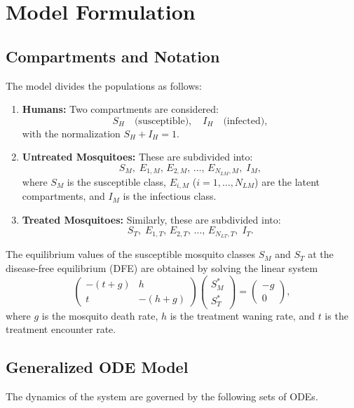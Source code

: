 \documentclass[12pt]{article}
\begin{document}
\section{Model Formulation}

\subsection{Compartments and Notation}
The model divides the populations as follows:
\begin{enumerate}
    \item \textbf{Humans:} Two compartments are considered:
    \[
    S_H \quad \text{(susceptible)}, \quad I_H \quad \text{(infected)},
    \]
    with the normalization \(S_H + I_H = 1\).
    
    \item \textbf{Untreated Mosquitoes:} These are subdivided into:
    \[
    S_M,\; E_{1,M},\, E_{2,M},\, \dots,\, E_{N_{LM},M},\; I_M,
    \]
    where \(S_M\) is the susceptible class, \(E_{i,M}\) (\(i=1,\dots,N_{LM}\)) are the latent compartments, and \(I_M\) is the infectious class.
    
    \item \textbf{Treated Mosquitoes:} Similarly, these are subdivided into:
    \[
    S_T,\; E_{1,T},\, E_{2,T},\, \dots,\, E_{N_{LT},T},\; I_T.
    \]
\end{enumerate}

The equilibrium values of the susceptible mosquito classes \(S_M\) and \(S_T\) at the disease-free equilibrium (DFE) are obtained by solving the linear system
\[
\begin{pmatrix}
-(t+g) & h \\
t       & -(h+g)
\end{pmatrix}
\begin{pmatrix}
S^*_M \\ S^*_T
\end{pmatrix}
=
\begin{pmatrix}
-g \\ 0
\end{pmatrix},
\]
where \(g\) is the mosquito death rate, \(h\) is the treatment waning rate, and \(t\) is the treatment encounter rate.

\subsection{Generalized ODE Model}
The dynamics of the system are governed by the following sets of ODEs.
\end{document}
